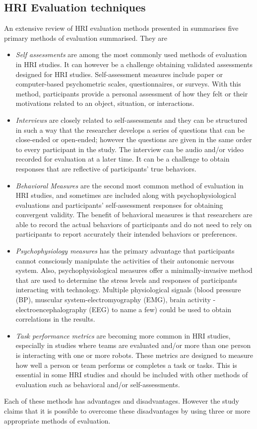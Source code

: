 {\subsection{HRI Evaluation techniques}
	An extensive review of HRI evaluation methods presented in \cite{bethel2010review} summarises five primary methods of evaluation summarised. They are
\begin{itemize}
\item \emph{Self assessments} are among the most commonly used methods of evaluation in HRI studies. It can however be a challenge obtaining validated assessments designed for HRI studies. Self-assessment measures include paper or computer-based psychometric scales, questionnaires, or surveys. With this method, participants provide a personal assessment of how they felt or their motivations related to an object, situation, or interactions.
\item \emph{Interviews} are closely related to self-assessments and they can be structured in such a way that  the researcher develops a series of questions that can be close-ended or open-ended; however the questions are given in the same order to every participant in the study. The interview can be audio and/or video recorded for evaluation at a later time. It can be a challenge to obtain responses that are reflective of participants’ true behaviors.
\item \emph{Behavioral Measures} are the second most common method of evaluation in HRI studies, and sometimes are included along with psychophysiological evaluations and participants’ self-assessment responses for obtaining convergent validity. The benefit of behavioral measures is that researchers are able to record the actual behaviors of participants and do not need to rely on participants to report accurately their intended behaviors or preferences.
\item \emph{Psychophysiology measures} has the primary advantage that participants cannot consciously manipulate the activities of their autonomic nervous system. Also, psychophysiological measures offer a minimally-invasive method that are used to determine the stress levels and responses of participants interacting with technology. Multiple physiological signals (blood pressure (BP), muscular system-electromyography (EMG), brain activity - electroencephalography (EEG) to name a few) could be used to obtain correlations in the results.
\item \emph{Task performance metrics} are becoming more common in HRI studies, especially in studies where teams are evaluated and/or more than one person is interacting with one or more robots. These metrics are designed to measure how well a person or team performs or completes a task or tasks. This is essential in some HRI studies and should be included with other methods of evaluation such as behavioral and/or self-assessments.
\end{itemize}
Each of these methods has advantages and disadvantages. However the study claims that it is possible to overcome these disadvantages by using three or more appropriate methods of evaluation. 

}
